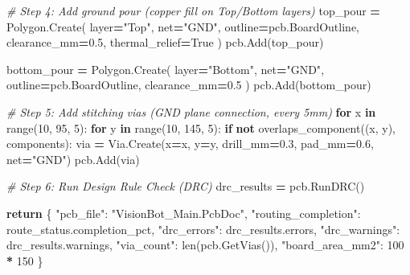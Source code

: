 \documentclass[
]{article}
\newenvironment{Shaded}{\begin{snugshade}}{\end{snugshade}}
\newcommand{\BuiltInTok}[1]{#1}
\newcommand{\CommentTok}[1]{\textcolor[rgb]{0.56,0.35,0.01}{\textit{#1}}}
\newcommand{\ControlFlowTok}[1]{\textcolor[rgb]{0.13,0.29,0.53}{\textbf{#1}}}
\newcommand{\DecValTok}[1]{\textcolor[rgb]{0.00,0.00,0.81}{#1}}
\newcommand{\FloatTok}[1]{\textcolor[rgb]{0.00,0.00,0.81}{#1}}
\newcommand{\KeywordTok}[1]{\textcolor[rgb]{0.13,0.29,0.53}{\textbf{#1}}}
\newcommand{\NormalTok}[1]{#1}
\newcommand{\OperatorTok}[1]{\textcolor[rgb]{0.81,0.36,0.00}{\textbf{#1}}}
\newcommand{\StringTok}[1]{\textcolor[rgb]{0.31,0.60,0.02}{#1}}
\newcommand{\VariableTok}[1]{\textcolor[rgb]{0.00,0.00,0.00}{#1}}
\begin{document}
\begin{Shaded}
\begin{Highlighting}[]
    \CommentTok{\# Step 4: Add ground pour (copper fill on Top/Bottom layers)}
\NormalTok{    top\_pour }\OperatorTok{=}\NormalTok{ Polygon.Create(}
\NormalTok{        layer}\OperatorTok{=}\StringTok{"Top"}\NormalTok{,}
\NormalTok{        net}\OperatorTok{=}\StringTok{"GND"}\NormalTok{,}
\NormalTok{        outline}\OperatorTok{=}\NormalTok{pcb.BoardOutline,}
\NormalTok{        clearance\_mm}\OperatorTok{=}\FloatTok{0.5}\NormalTok{,}
\NormalTok{        thermal\_relief}\OperatorTok{=}\VariableTok{True}
\NormalTok{    )}
\NormalTok{    pcb.Add(top\_pour)}

\NormalTok{    bottom\_pour }\OperatorTok{=}\NormalTok{ Polygon.Create(}
\NormalTok{        layer}\OperatorTok{=}\StringTok{"Bottom"}\NormalTok{,}
\NormalTok{        net}\OperatorTok{=}\StringTok{"GND"}\NormalTok{,}
\NormalTok{        outline}\OperatorTok{=}\NormalTok{pcb.BoardOutline,}
\NormalTok{        clearance\_mm}\OperatorTok{=}\FloatTok{0.5}
\NormalTok{    )}
\NormalTok{    pcb.Add(bottom\_pour)}

    \CommentTok{\# Step 5: Add stitching vias (GND plane connection, every 5mm)}
    \ControlFlowTok{for}\NormalTok{ x }\KeywordTok{in} \BuiltInTok{range}\NormalTok{(}\DecValTok{10}\NormalTok{, }\DecValTok{95}\NormalTok{, }\DecValTok{5}\NormalTok{):}
        \ControlFlowTok{for}\NormalTok{ y }\KeywordTok{in} \BuiltInTok{range}\NormalTok{(}\DecValTok{10}\NormalTok{, }\DecValTok{145}\NormalTok{, }\DecValTok{5}\NormalTok{):}
            \ControlFlowTok{if} \KeywordTok{not}\NormalTok{ overlaps\_component((x, y), components):}
\NormalTok{                via }\OperatorTok{=}\NormalTok{ Via.Create(x}\OperatorTok{=}\NormalTok{x, y}\OperatorTok{=}\NormalTok{y, drill\_mm}\OperatorTok{=}\FloatTok{0.3}\NormalTok{, pad\_mm}\OperatorTok{=}\FloatTok{0.6}\NormalTok{, net}\OperatorTok{=}\StringTok{"GND"}\NormalTok{)}
\NormalTok{                pcb.Add(via)}

    \CommentTok{\# Step 6: Run Design Rule Check (DRC)}
\NormalTok{    drc\_results }\OperatorTok{=}\NormalTok{ pcb.RunDRC()}

    \ControlFlowTok{return}\NormalTok{ \{}
        \StringTok{"pcb\_file"}\NormalTok{: }\StringTok{"VisionBot\_Main.PcbDoc"}\NormalTok{,}
        \StringTok{"routing\_completion"}\NormalTok{: route\_status.completion\_pct,}
        \StringTok{"drc\_errors"}\NormalTok{: drc\_results.errors,}
        \StringTok{"drc\_warnings"}\NormalTok{: drc\_results.warnings,}
        \StringTok{"via\_count"}\NormalTok{: }\BuiltInTok{len}\NormalTok{(pcb.GetVias()),}
        \StringTok{"board\_area\_mm2"}\NormalTok{: }\DecValTok{100} \OperatorTok{*} \DecValTok{150}
\NormalTok{    \}}


\end{Highlighting}
\end{Shaded}
\end{document}
